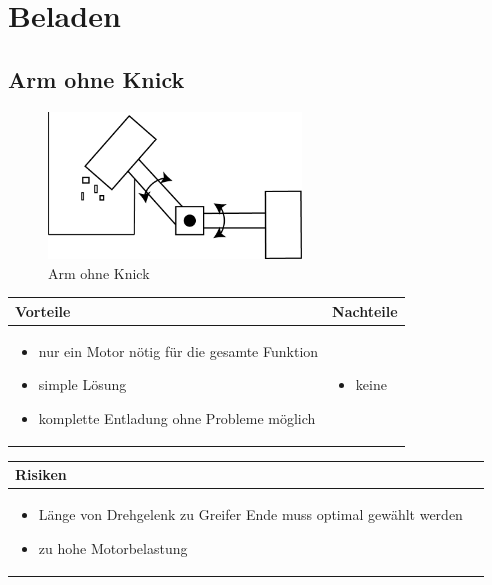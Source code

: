 
\section{Beladen}


\subsection{Arm ohne Knick}
\begin{figure} [hbp]
	\centering
	\includegraphics[width=0.6\textwidth]{fig/Beladen_1.png}
	\caption{Arm ohne Knick}
\end{figure}

\begin{table}[h]
\begin{tabular}{p{} | p{}}


 \textbf{Vorteile} & \textbf{Nachteile} \\ \hline
	 
\begin{itemize}
\item nur ein Motor nötig für die gesamte Funktion
\item simple Lösung
\item komplette Entladung ohne Probleme möglich
\end{itemize}

 
 &
 
\begin{itemize}
\item keine
\end{itemize}

\end{tabular}
\end{table}

\begin{table}[h]
\begin{tabular}{p{}p{}}


 \textbf{Risiken} & \\ \hline
	 
\begin{itemize}
\item Länge von Drehgelenk zu Greifer Ende muss optimal gewählt werden
\item zu hohe Motorbelastung
\end{itemize}
 
\end{tabular}
\end{table}

